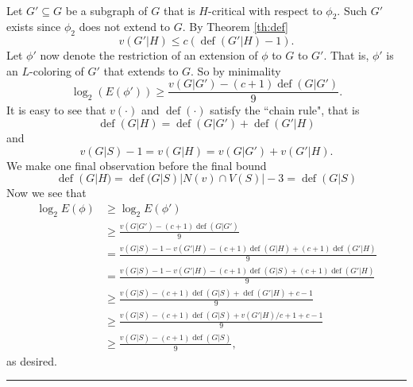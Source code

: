 \documentclass[letterpaper,12pt,oneside,onecolumn]{article}
\newenvironment{proof}{{\bf Proof:  }}{\hfill\rule{2mm}{2mm}}
\DeclareMathOperator{\defi}{def}
\begin{document}
\begin{proof}
	\paragraph{}
	Let $G' \subseteq G$ be a subgraph of $G$ that is $H$-critical with respect to $\phi_2$. Such $G'$ exists since $\phi_2$ does not extend to $G$. By Theorem \ref{th:def} $$v(G'|H) \leq c(\defi(G'|H) -1).$$
	Let $\phi'$ now denote the restriction of an extension of $\phi$ to $G$ to $G'$. That is, $\phi'$ is an $L$-coloring of $G'$ that extends to $G$. So by minimality
	$$\log_2(E(\phi')) \geq \frac{v(G|G') - (c+1)\defi(G|G')}{9}.$$
	It is easy to see that $v(\cdot)$ and $\defi(\cdot)$ satisfy the ``chain rule", that is
	$$\defi(G|H) = \defi(G|G') + \defi(G'|H)$$
	and
	$$v(G|S) - 1 = v(G|H) = v(G|G') + v(G'|H).$$
	We make one final observation before the final bound
	$$\defi(G|H) = \defi(G|S) |N(v)\cap V(S)| -3 = \defi(G|S) $$
	Now we see that
	\begin{align*}
	\log_2E(\phi) &\geq \log_2E(\phi')\\
	&\geq \frac{v(G|G') - (c+1)\defi(G|G')}{9} \\
	&= \frac{v(G|S) -1 -v(G'|H) -(c+1)\defi(G|H) + (c+1)\defi(G'|H)}{9}\\
	&=\frac{v(G|S) -1 -v(G'|H) -(c+1)\defi(G|S) + (c+1)\defi(G'|H)}{9}\\
	&\geq \frac{v(G|S) -(c+1)\defi(G|S) +\defi(G'|H) + c - 1}{9} \\
	&\geq \frac{v(G|S) -(c+1)\defi(G|S) +v(G'|H)/c + 1 + c - 1}{9}\\
	&\geq \frac{v(G|S) -(c+1)\defi(G|S)}{9},
	\end{align*}
	as desired.
\end{proof}

\section{}
\end{document}
